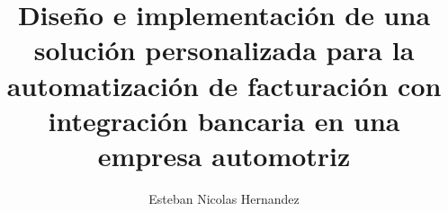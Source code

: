 \documentclass[%
    language=spanish,   %
    guias=false,        %
    pdfa=false,         %
]{usal-proyecto-final}
\title{Diseño e implementación de una solución personalizada para la
       automatización de facturación con integración bancaria en una
       empresa automotriz}
\author{Esteban Nicolas Hernandez}
\begin{document}
    \frontmatter

    \mainmatter
    
    \glsresetall %
    
    
    
    
    
    
    

    \backmatter

    \begin{appendices}
        
    \end{appendices}


    \glosarios
\end{document}
